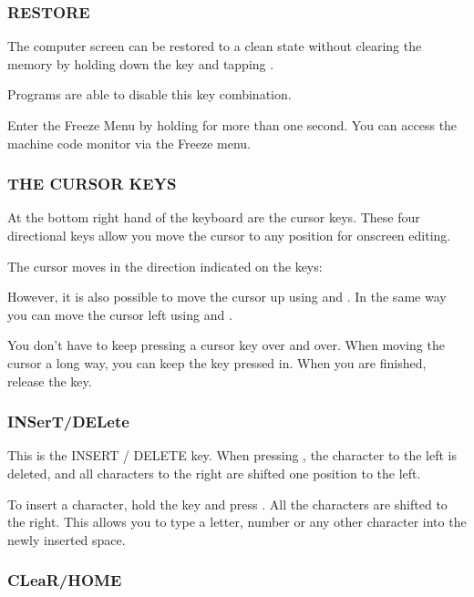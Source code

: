 \subsubsection{RESTORE}

The computer screen can be restored to a clean state without clearing the memory by holding down the  key and tapping .

Programs are able to disable this key combination.

Enter the Freeze Menu by holding  for more than one second. You can access the machine code monitor via the Freeze menu.

\newpage

\subsubsection{THE CURSOR KEYS}

At the bottom right hand of the keyboard are the cursor keys. These four directional keys allow you move the cursor to any position for onscreen editing.

The cursor moves in the direction indicated on the keys: \megakey{$\leftarrow$} \megakey{$\uparrow$} \megakey{$\rightarrow$} \megakey{$\downarrow$}

However, it is also possible to move the cursor up using  and \megakey{$\downarrow$}. In the same way you can move the cursor left using  and \megakey{$\rightarrow$}.

You don't have to keep pressing a cursor key over and over. When moving the cursor a long way, you can keep the key pressed in. When you are finished, release the key.

\subsubsection{INSerT/DELete}

This is the INSERT / DELETE key. When pressing , the character to the left is deleted, and all characters to the right are shifted one position to the left.

To insert a character, hold the  key and press . All the characters are shifted to the right. This allows you to type a letter, number or any other character into the newly inserted space.


\subsubsection{CLeaR/HOME}

